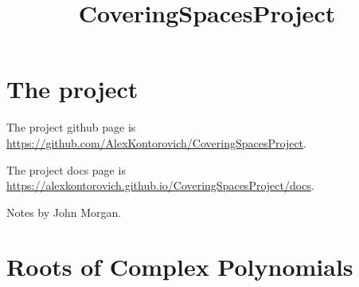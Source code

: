 \usepackage{amsmath, amsthm}
\usepackage{hyperref}

\theoremstyle{definition}
\newtheorem{definition}{Definition}
\newtheorem{theorem}{Theorem}
\newtheorem{proposition}{Proposition}
\newtheorem{lemma}{Lemma}
\newtheorem{corollary}{Corollary}

\title{CoveringSpacesProject}

\newcommand{\eps}{\epsilon}

\newcommand{\R}{\mathbb{R}}
\newcommand{\Q}{\mathbb{Q}}
\newcommand{\C}{\mathbb{C}}
\newcommand{\Z}{\mathbb{Z}}
\newcommand{\N}{\mathbb{N}}



\maketitle

\chapter{The project}

The project github page is \url{https://github.com/AlexKontorovich/CoveringSpacesProject}.

The project docs page is \url{https://alexkontorovich.github.io/CoveringSpacesProject/docs}.

Notes by John Morgan.

\chapter{Roots of Complex Polynomials}


%

%

%
%


